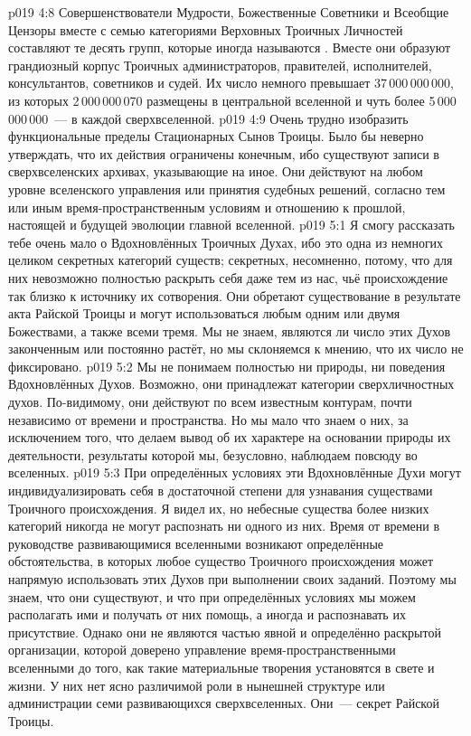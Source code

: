 \vs p019 4:8 \pc Совершенствователи Мудрости, Божественные Советники и Всеобщие Цензоры вместе с семью категориями Верховных Троичных Личностей составляют те десять групп, которые иногда называются . Вместе они образуют грандиозный корпус Троичных администраторов, правителей, исполнителей, консультантов, советников и судей. Их число немного превышает 37\,000\,000\,000, из которых 2\,000\,000\,070 размещены в центральной вселенной и чуть более 5\,000\,000\,000~--- в каждой сверхвселенной.
\vs p019 4:9 Очень трудно изобразить функциональные пределы Стационарных Сынов Троицы. Было бы неверно утверждать, что их действия ограничены конечным, ибо существуют записи в сверхвселенских архивах, указывающие на иное. Они действуют на любом уровне вселенского управления или принятия судебных решений, согласно тем или иным время\hyp{}пространственным условиям и отношению к прошлой, настоящей и будущей эволюции главной вселенной.
\vs p019 5:1 Я смогу рассказать тебе очень мало о Вдохновлённых Троичных Духах, ибо это одна из немногих целиком секретных категорий существ; секретных, несомненно, потому, что для них невозможно полностью раскрыть себя даже тем из нас, чьё происхождение так близко к источнику их сотворения. Они обретают существование в результате акта Райской Троицы и могут использоваться любым одним или двумя Божествами, а также всеми тремя. Мы не знаем, являются ли число этих Духов законченным или постоянно растёт, но мы склоняемся к мнению, что их число не фиксировано.
\vs p019 5:2 Мы не понимаем полностью ни природы, ни поведения Вдохновлённых Духов. Возможно, они принадлежат категории сверхличностных духов. По\hyp{}видимому, они действуют по всем известным контурам, почти независимо от времени и пространства. Но мы мало что знаем о них, за исключением того, что делаем вывод об их характере на основании природы их деятельности, результаты которой мы, безусловно, наблюдаем повсюду во вселенных.
\vs p019 5:3 При определённых условиях эти Вдохновлённые Духи могут индивидуализировать себя в достаточной степени для узнавания существами Троичного происхождения. Я видел их, но небесные существа более низких категорий никогда не могут распознать ни одного из них. Время от времени в руководстве развивающимися вселенными возникают определённые обстоятельства, в которых любое существо Троичного происхождения может напрямую использовать этих Духов при выполнении своих заданий. Поэтому мы знаем, что они существуют, и что при определённых условиях мы можем располагать ими и получать от них помощь, а иногда и распознавать их присутствие. Однако они не являются частью явной и определённо раскрытой организации, которой доверено управление время\hyp{}пространственными вселенными до того, как такие материальные творения установятся в свете и жизни. У них нет ясно различимой роли в нынешней структуре или администрации семи развивающихся сверхвселенных. Они~--- секрет Райской Троицы.
